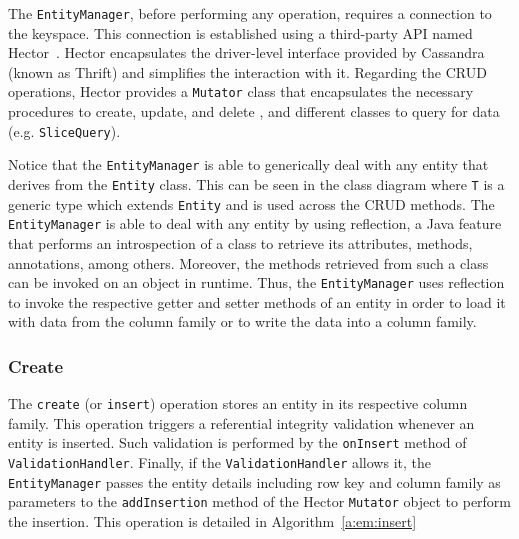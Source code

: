 	The \texttt{EntityManager},  before performing any operation,  requires a
	connection to the keyspace.  This connection is established using a third-party
	\ac{API} named Hector~\citep{hector}.  Hector  encapsulates the driver-level
	interface provided by Cassandra (known as Thrift) and simplifies the interaction
	with it.  Regarding the \ac{CRUD} operations,  Hector provides  a
	\texttt{Mutator} class that  encapsulates the necessary procedures to
	create, update, and delete , and different classes to query
	for data (e.g. \texttt{SliceQuery}).
	 
	 Notice that  the \texttt{EntityManager} is able to generically deal with any
	 entity that derives from the \texttt{Entity} class. This can be seen in the
	 class diagram where \texttt{T} is a generic type which extends \texttt{Entity} 
	 and is used across the \ac{CRUD} methods. The \texttt{EntityManager} is able
	 to deal with any entity by using reflection, a Java
	 feature that performs  an introspection of a class to retrieve its
	 attributes, methods, annotations, among others. Moreover, the
	 methods retrieved from such a class can be invoked on an object in runtime. 
	 Thus, the \texttt{EntityManager} uses reflection to invoke the respective 
	 getter and setter methods of an entity in order to load it with data
	 from the column family or to write the data into a column family.
	 
	 
	
	
	
	
	
		\subsubsection{Create}
		The \texttt{create} (or \texttt{insert}) operation stores an entity in its
		respective column family. This operation triggers a referential integrity
		 validation whenever an  entity is  inserted.  Such validation is performed by
		 the \texttt{onInsert} method of \texttt{ValidationHandler}. Finally, if the
 		 \texttt{ValidationHandler} allows it,  the \texttt{EntityManager} passes the
		  entity details  including row key and column family as parameters to the
		 \texttt{addInsertion} method of the Hector \texttt{Mutator} object to perform
		 the insertion. This operation is detailed in Algorithm~\ref{a:em:insert}
		 
